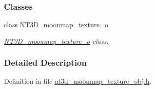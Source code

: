 \subsubsection*{Classes}
\begin{DoxyCompactItemize}
\item 
class \hyperlink{class_n_t3_d__moonmap__texture__o}{NT3D\_\-moonmap\_\-texture\_\-o}
\begin{DoxyCompactList}\small\item\em \hyperlink{class_n_t3_d__moonmap__texture__o}{NT3D\_\-moonmap\_\-texture\_\-o} class. \item\end{DoxyCompactList}\end{DoxyCompactItemize}


\subsubsection{Detailed Description}


Definition in file \hyperlink{nt3d__moonmap__texture__obj_8h_source}{nt3d\_\-moonmap\_\-texture\_\-obj.h}.

